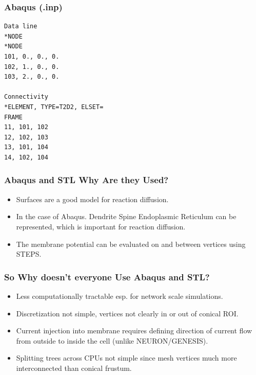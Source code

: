 \documentclass[notes=hide]{beamer}
\begin{document}
{\begin{frame}
\begin{figure}
\end{figure}
\end{frame}



\begin{frame}[fragile]
\frametitle{Abaqus (.inp)}
\begin{verbatim}
Data line 
*NODE
*NODE
101, 0., 0., 0.
102, 1., 0., 0.
103, 2., 0., 0.

Connectivity
*ELEMENT, TYPE=T2D2, ELSET=
FRAME
11, 101, 102
12, 102, 103 
13, 101, 104 
14, 102, 104 

\end{verbatim}
\end{frame}

\begin{frame}
\frametitle{Abaqus and STL Why Are they Used?}
\begin{itemize}

\item Surfaces are a good model for reaction diffusion.
\vfill
\item In the case of Abaqus. Dendrite Spine Endoplasmic Reticulum can be represented, which is important for reaction diffusion.
\vfill
\item The membrane potential can be evaluated on and between vertices using STEPS.

\end{itemize}
\end{frame}

\begin{frame}
\frametitle{So Why doesn't everyone Use Abaqus and STL?}
\begin{itemize}

\vfill
\item Less computationally tractable esp. for network scale simulations.
\vfill
\item Discretization not simple, vertices not clearly in or out of conical ROI.
\vfill
\item Current injection into membrane requires defining direction of current flow from outside to inside the cell (unlike NEURON/GENESIS).
\vfill
\item Splitting trees across CPUs not simple since mesh vertices much more interconnected than conical frustum.


\end{itemize}
\end{frame}}
\end{document}
